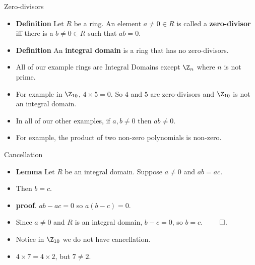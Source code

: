 \documentclass{beamer}
\begin{document}

\begin{frame}{Zero-divisors}

\begin{itemize}
  \item \textbf{Definition} Let $R$ be a ring. An element $a\not=0\in R$ is called a \textbf{zero-divisor} iff there is a $b\not=0\in R$ such that $ab=0$.
  \item \textbf{Definition} An \textbf{integral domain} is a ring that has no zero-divisors.
  \item All of our example rings are Integral Domains except $\Z_n$ where $n$ is not prime.
  \item For example in $\Z_{10}$, $4\times 5 = 0$. So $4$ and $5$ are zero-divisors and $\Z_{10}$ is not an integral domain.
  \item In all of our other examples, if $a,b\not=0$ then $ab \not = 0$.
  \item For example, the product of two non-zero polynomials is non-zero.
\end{itemize}

\end{frame}



\begin{frame}{Cancellation}

\begin{itemize}
  \item \textbf{Lemma} Let $R$ be an integral domain. Suppose $a\not=0$ and $ab = ac$.
  \item Then $b=c$.
  \item \textbf{proof}. $ab - ac = 0$ so $a(b-c) = 0$.
  \item Since $a\not=0$ and $R$ is an integral domain, $b-c=0$, so $b=c$. $\qed$.
  \item Notice in $\Z_{10}$ we do not have cancellation.
  \item $4\times 7 = 4 \times 2$, but $7\not= 2$.
\end{itemize}

\end{frame}


\end{document}
